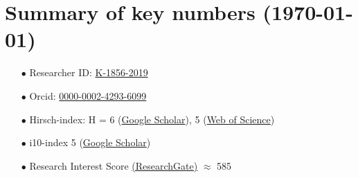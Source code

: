 \documentclass[11pt,a4paper,roman,english,colorlinks,linkcolor=true]{moderncv}
\begin{document}
\section{\textbf{Summary of key numbers (\today)}}
\begin{enumerate}[leftmargin=2.5cm]
	\item[$\bullet$] Researcher ID: \href{https://www.webofscience.com/wos/author/record/K-1856-2019}{K-1856-2019}
	\item[$\bullet$] Orcid: \href{https://orcid.org/0000-0002-4293-6099}{0000-0002-4293-6099}
	\item[$\bullet$] Hirsch-index: H = 6 (\href{https://scholar.google.com/citations?hl=en&user=67aQviYAAAAJ}{Google Scholar}), 5 (\href{https://www.webofscience.com/wos/author/record/K-1856-2019}{Web of Science})
	\item[$\bullet$] i10-index 5 (\href{https://scholar.google.com/citations?hl=en&user=67aQviYAAAAJ}{Google Scholar})
	\item[$\bullet$] Research Interest Score \href{https://www.researchgate.net/profile/Vatsal-Sanjay-2}{(ResearchGate)} $\approx$ 585
\end{enumerate}
\end{document}
